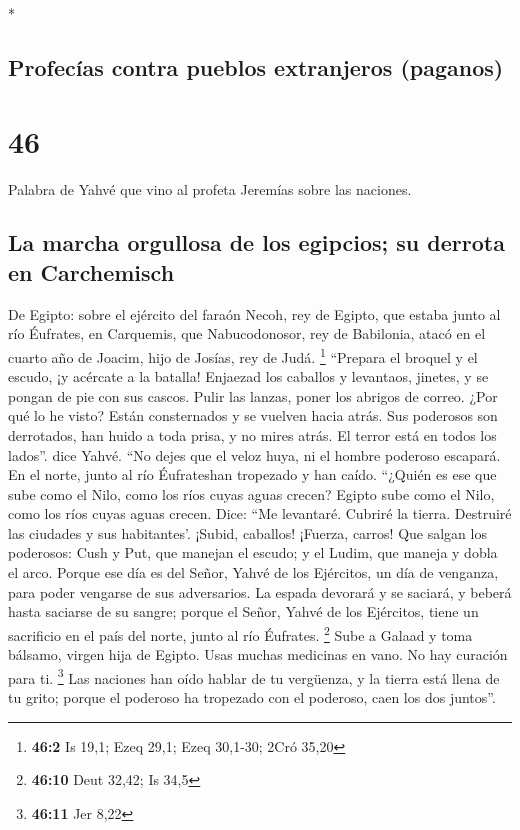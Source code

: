 \begin{paracol}{2}
\begin{otherlanguage}{english}
\end{otherlanguage}

\switchcolumn[0]*

\hypertarget{profecuxedas-contra-pueblos-extranjeros-paganos}{%
\subsection{Profecías contra pueblos extranjeros
(paganos)}\label{profecuxedas-contra-pueblos-extranjeros-paganos}}

\hypertarget{section-90}{%
\section{46}\label{section-90}}

 Palabra de Yahvé que vino al profeta Jeremías sobre las
naciones.

\hypertarget{la-marcha-orgullosa-de-los-egipcios-su-derrota-en-carchemisch}{%
\subsection{La marcha orgullosa de los egipcios; su derrota en
Carchemisch}\label{la-marcha-orgullosa-de-los-egipcios-su-derrota-en-carchemisch}}

 De Egipto: sobre el ejército del faraón Necoh, rey de
Egipto, que estaba junto al río Éufrates, en Carquemis, que
Nabucodonosor, rey de Babilonia, atacó en el cuarto año de Joacim, hijo
de Josías, rey de Judá. \footnote{\textbf{46:2} Is 19,1; Ezeq 29,1; Ezeq
  30,1-30; 2Cró 35,20}  ``Prepara el broquel y el escudo,
¡y acércate a la batalla!  Enjaezad los caballos y
levantaos, jinetes, y se pongan de pie con sus cascos. Pulir las lanzas,
poner los abrigos de correo.  ¿Por qué lo he visto? Están
consternados y se vuelven hacia atrás. Sus poderosos son derrotados, han
huido a toda prisa, y no mires atrás. El terror está en todos los
lados''. dice Yahvé.  ``No dejes que el veloz huya, ni el
hombre poderoso escapará. En el norte, junto al río Éufrateshan
tropezado y han caído.  ``¿Quién es ese que sube como el
Nilo, como los ríos cuyas aguas crecen?  Egipto sube como
el Nilo, como los ríos cuyas aguas crecen. Dice: ``Me levantaré. Cubriré
la tierra. Destruiré las ciudades y sus habitantes'. 
¡Subid, caballos! ¡Fuerza, carros! Que salgan los poderosos: Cush y Put,
que manejan el escudo; y el Ludim, que maneja y dobla el arco.
 Porque ese día es del Señor, Yahvé de los Ejércitos, un
día de venganza, para poder vengarse de sus adversarios. La espada
devorará y se saciará, y beberá hasta saciarse de su sangre; porque el
Señor, Yahvé de los Ejércitos, tiene un sacrificio en el país del norte,
junto al río Éufrates. \footnote{\textbf{46:10} Deut 32,42; Is 34,5}
 Sube a Galaad y toma bálsamo, virgen hija de Egipto.
Usas muchas medicinas en vano. No hay curación para ti. \footnote{\textbf{46:11}
  Jer 8,22}  Las naciones han oído hablar de tu
vergüenza, y la tierra está llena de tu grito; porque el poderoso ha
tropezado con el poderoso, caen los dos juntos''.


\end{paracol}
